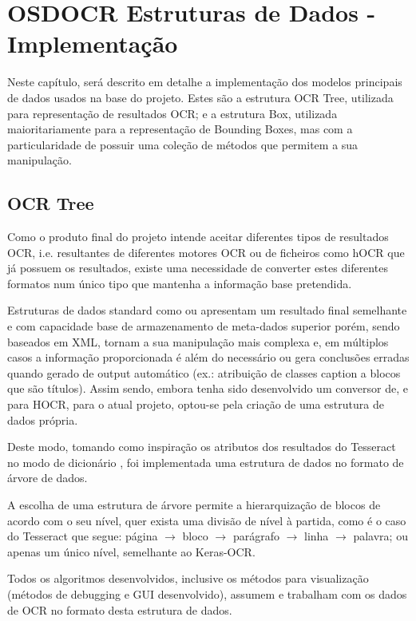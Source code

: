 \chapter{OSDOCR Estruturas de Dados - Implementação}
\label{cap_osdocr_estrutura_dados_implementacao}

Neste capítulo, será descrito em detalhe a implementação dos modelos principais de dados usados na base do projeto. Estes são a estrutura OCR Tree, utilizada para representação de resultados OCR; e a estrutura Box, utilizada maioritariamente para a representação de Bounding Boxes, mas com a particularidade de possuir uma coleção de métodos que permitem a sua manipulação.


\section{OCR Tree}
\label{ocr_tree}

Como o produto final do projeto intende aceitar diferentes tipos de resultados OCR, i.e. resultantes de diferentes motores OCR ou de ficheiros como hOCR que já possuem os resultados, existe uma necessidade de converter estes diferentes formatos num único tipo que mantenha a informação base pretendida.

Estruturas de dados standard como \citep{hocr_doc} ou \citep{alto_doc} apresentam um resultado final semelhante e com capacidade base de armazenamento de meta-dados superior porém, sendo baseados em XML, tornam a sua manipulação mais complexa e, em múltiplos casos a informação proporcionada é além do necessário ou gera conclusões erradas quando gerado de output automático (ex.: atribuição de classes caption a blocos que são títulos). Assim sendo, embora tenha sido desenvolvido um conversor de, e para HOCR, para o atual projeto, optou-se pela criação de uma estrutura de dados própria.

Deste modo, tomando como inspiração os atributos dos resultados do Tesseract no modo de dicionário \citep{tesseract_doc}, foi implementada uma estrutura de dados no formato de árvore de dados.

A escolha de uma estrutura de árvore permite a hierarquização de blocos de acordo com o seu nível, quer exista uma divisão de nível à partida, como é o caso do Tesseract que segue: página $\longrightarrow$ bloco $\longrightarrow$ parágrafo $\longrightarrow$ linha $\longrightarrow$ palavra; ou apenas um único nível, semelhante ao Keras-OCR.

Todos os algoritmos desenvolvidos, inclusive os métodos para visualização (métodos de debugging e GUI desenvolvido), assumem e trabalham com os dados de OCR no formato desta estrutura de dados.

